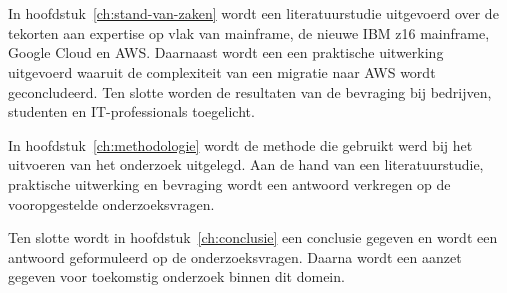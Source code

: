 \section{}
\label{sec:opzet-bachelorproef}


In hoofdstuk~\ref{ch:stand-van-zaken} wordt een literatuurstudie uitgevoerd over de tekorten aan expertise op vlak van mainframe, de nieuwe IBM z16 mainframe, Google Cloud en AWS. Daarnaast wordt een een praktische uitwerking uitgevoerd waaruit de complexiteit van een migratie naar AWS wordt geconcludeerd. Ten slotte worden de resultaten van de bevraging bij bedrijven, studenten en IT-professionals toegelicht.

In hoofdstuk~\ref{ch:methodologie} wordt de methode die  gebruikt werd bij het uitvoeren van het onderzoek uitgelegd. Aan de hand van een literatuurstudie, praktische uitwerking en bevraging wordt een antwoord verkregen op de vooropgestelde onderzoeksvragen.

Ten slotte wordt in hoofdstuk~\ref{ch:conclusie} een conclusie gegeven en wordt een antwoord geformuleerd op de onderzoeksvragen. Daarna wordt een aanzet gegeven voor toekomstig onderzoek binnen dit domein.
